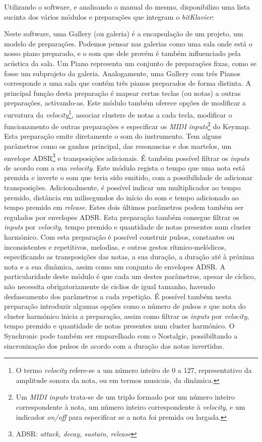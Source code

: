 \documentclass[../main.tex]{subfiles}
\begin{document}
Utilizando o software, e analisando o manual do mesmo\cite{bk2018}, disponibilizo uma lista sucinta dos vários módulos e preparações que integram o \textit{bitKlavier}:
\begin{description}
     Neste software, uma Gallery (ou galeria) é a encapsulação de um projeto, um modelo de preparações. Podemos pensar nas galerias como uma sala onde está o nosso piano preparado, e o som que dele provém é também influenciado pela acústica da sala.
     Um Piano representa um conjunto de preparações fixas, como se fosse um subprojeto da galeria. Analogamente, uma Gallery com três Pianos corresponde a uma sala que contém três pianos preparados de forma distinta.
     A principal função desta preparação é mapear certas teclas (ou notas) a outras preparações, activando-as. Este módulo também oferece opções de modificar a curvatura da \textit{velocity}\footnote{O termo \textit{velocity} refere-se a um número inteiro de 0 a 127, representativo da amplitude sonora da nota, ou em termos musicais, da dinâmica.}, associar clusters de notas a cada tecla, modificar o funcionamento de outras preparações e especificar os \textit{MIDI inputs}\footnote{Um \textit{MIDI inputs} trata-se de um triplo formado por um número inteiro correspondente à nota, um número inteiro correspondente à \textit{velocity}, e um indicador \textit{on/off} para especificar se a nota foi premida ou largada.} do Keymap.
     Esta preparação emite diretamente o som do instrumento. Tem alguns parâmetros como os ganhos principal, das resonancias e dos martelos, um envelope ADSR\footnote{ADSR: \textit{attack, decay, sustain, release}} e transposições adicionais. É também possível filtrar os \textit{inputs} de acordo com a sua \textit{velocity}.
     Este módulo regista o tempo que uma nota está premida e inverte o som que teria sido emitido, com a possibilidade de adicionar transposições. Adicionalmente, é possível indicar um multiplicador ao tempo premido, distância em milisegundos do início do som e tempo adicionado ao tempo premido em \textit{release}. Estes dois últimos parâmetros podem também ser regulados por envelopes ADSR. Esta preparação também consegue filtrar os \textit{inputs} por \textit{velocity}, tempo premido e quantidade de notas presentes num cluster harmónico.
     Com esta preparação é possível construir pulsos, constantes ou inconsistentes e repetitivos, melodias, e outros gestos rítmico-melódicos, especificando as transposições das notas, a sua duração, a duração até à próxima nota e a sua dinâmica, assim como um conjunto de envelopes ADSR. A particularidade deste módulo é que cada um destes parâmetros, apesar de cíclico, não necessita obrigatoriamente de ciclios de igual tamanho, havendo desfaseamento dos parâmetros a cada repetição. É possível também nesta preparação introduzir algumas opções como o número de pulsos e que nota do cluster harmónico inicia a preparação, assim como filtrar os \textit{inputs} por \textit{velocity}, tempo premido e quantidade de notas presentes num cluster harmónico. O Synchronic pode também ser emparelhado com o Nostalgic, possibiltando a sincronização dos pulsos de acordo com a duração das notas invertidas.

\end{description}
\end{document}
